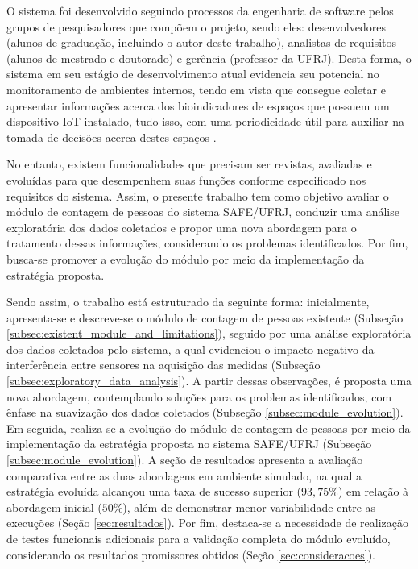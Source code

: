 O sistema foi desenvolvido seguindo processos da engenharia de software pelos grupos de pesquisadores que compõem o projeto, sendo eles: desenvolvedores (alunos de graduação, incluindo o autor deste trabalho), analistas de requisitos (alunos de mestrado e doutorado) e gerência (professor da UFRJ). Desta forma, o sistema em seu estágio de desenvolvimento atual evidencia seu potencial no monitoramento de ambientes internos, tendo em vista que consegue coletar e apresentar informações acerca dos bioindicadores de espaços que possuem um dispositivo IoT instalado, tudo isso, com uma periodicidade útil para auxiliar na tomada de decisões acerca destes espaços \cite{SAFE-IOT}.

No entanto, existem funcionalidades que precisam ser revistas, avaliadas e evoluídas para que desempenhem suas funções conforme especificado nos requisitos do sistema. Assim, o presente trabalho tem como objetivo avaliar o módulo de contagem de pessoas do sistema SAFE/UFRJ, conduzir uma análise exploratória dos dados coletados e propor uma nova abordagem para o tratamento dessas informações, considerando os problemas identificados. Por fim, busca-se promover a evolução do módulo por meio da implementação da estratégia proposta.

Sendo assim, o trabalho está estruturado da seguinte forma: inicialmente, apresenta-se e descreve-se o módulo de contagem de pessoas existente (Subseção \ref{subsec:existent_module_and_limitations}), seguido por uma análise exploratória dos dados coletados pelo sistema, a qual evidenciou o impacto negativo da interferência entre sensores na aquisição das medidas (Subseção \ref{subsec:exploratory_data_analysis}). A partir dessas observações, é proposta uma nova abordagem, contemplando soluções para os problemas identificados, com ênfase na suavização dos dados coletados (Subseção \ref{subsec:module_evolution}). Em seguida, realiza-se a evolução do módulo de contagem de pessoas por meio da implementação da estratégia proposta no sistema SAFE/UFRJ (Subseção \ref{subsec:module_evolution}). A seção de resultados apresenta a avaliação comparativa entre as duas abordagens em ambiente simulado, na qual a estratégia evoluída alcançou uma taxa de sucesso superior ($93{,}75\%$) em relação à abordagem inicial ($50\%$), além de demonstrar menor variabilidade entre as execuções (Seção \ref{sec:resultados}). Por fim, destaca-se a necessidade de realização de testes funcionais adicionais para a validação completa do módulo evoluído, considerando os resultados promissores obtidos (Seção \ref{sec:consideracoes}).

